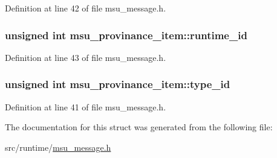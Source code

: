 Definition at line 42 of file msu\-\_\-message.\-h.

\hypertarget{structmsu__provinance__item_a03aec79bc90a021ad1d4ef1d2c3296e3}{
\subsubsection[{runtime\-\_\-id}]{\setlength{\rightskip}{0pt plus 5cm}unsigned int msu\-\_\-provinance\-\_\-item\-::runtime\-\_\-id}}\label{structmsu__provinance__item_a03aec79bc90a021ad1d4ef1d2c3296e3}


Definition at line 43 of file msu\-\_\-message.\-h.

\hypertarget{structmsu__provinance__item_a87a273f0d05488e4421a712399b17b8d}{
\subsubsection[{type\-\_\-id}]{\setlength{\rightskip}{0pt plus 5cm}unsigned int msu\-\_\-provinance\-\_\-item\-::type\-\_\-id}}\label{structmsu__provinance__item_a87a273f0d05488e4421a712399b17b8d}


Definition at line 41 of file msu\-\_\-message.\-h.



The documentation for this struct was generated from the following file\-:\begin{DoxyCompactItemize}
\item 
src/runtime/\hyperlink{msu__message_8h}{msu\-\_\-message.\-h}\end{DoxyCompactItemize}
